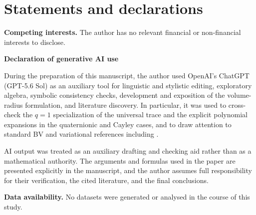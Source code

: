 \documentclass[11pt,reqno]{amsart}
\numberwithin{equation}{section}
\theoremstyle{definition}
\theoremstyle{remark}
\begin{document}
\section*{Statements and declarations}
\noindent\textbf{Competing interests.}
The author has no relevant financial or non-financial interests to disclose.

\noindent\textbf{Declaration of generative AI use}

During the preparation of this manuscript, the author used OpenAI's
ChatGPT (GPT-5.6 Sol) as an auxiliary tool for linguistic and stylistic
editing, exploratory algebra, symbolic consistency checks, development and
exposition of the volume-radius formulation, and literature discovery.  In
particular, it was used to cross-check the $q=1$ specialization of the
universal trace and the explicit polynomial expansions in the quaternionic
and Cayley cases, and to draw attention to standard BV and variational
references including \cite{AFP2000,Maggi2012,BarbosaDoCarmo1984,
BarbosaDoCarmoEschenburg1988,BattagliaMontefalconeMonti2019}.

AI output was treated as an auxiliary drafting and checking aid rather than
as a mathematical authority.  The arguments and formulas used in the paper
are presented explicitly in the manuscript, and the author assumes full
responsibility for their verification, the cited literature, and the final
conclusions.

\noindent\textbf{Data availability.}
No datasets were generated or analysed in the course of this study.
\end{document}
